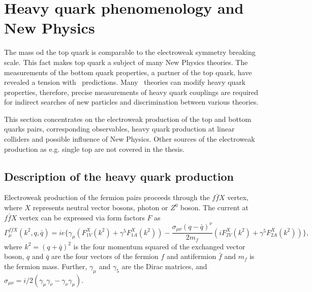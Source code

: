 	\section{Heavy quark phenomenology and New Physics}
The mass od the top quark is comparable to the electroweak symmetry breaking scale. 
This fact makes top quark a subject of many New Physics theories. 
The measurements of the bottom quark properties, a partner of the top quark, have revealed a tension with \sm\ predictions. 
Many \bsm\ theories can modify heavy quark properties, therefore, precise measurements of heavy quark couplings are required for indirect searches of new particles and discrimination between various theories. 

This section concentrates on the electroweak production of the top and bottom quarks pairs, corresponding observables, heavy quark production at linear colliders and possible influence of New Physics.
Other sources of the electroweak production as e.g. single top are not covered in the thesis. 


\subsection{Description of the heavy quark production}
Electroweak production of the fermion pairs proceeds through the $f\bar{f}X$ vertex, where $X$ represents neutral vector bosons, photon or $Z^0$ boson.  The current at $f\bar{f}X$ vertex can be expressed via form factors $F$ as 
\begin{equation}
\Gamma^{f\bar{f}X}_\mu (k^2,q,\bar{q}) = ie\{ \gamma_\mu (F^X_{1V}(k^2) + \gamma^5 F^X_{1A}(k^2)) - \frac{\sigma_{\mu\nu}(q-\bar{q})^\nu}{2m_f}(iF^X_{2V}(k^2) + \gamma^5 F^X_{2A}(k^2)) \},
\end{equation}
where $k^2= (q+\bar{q})^2$ is the four momentum squared of the exchanged vector boson, $q$ and $\bar{q}$ are the four vectors of the fermion $f$ and antifermion $\bar{f}$ and $m_f$ is the fermion mass. Further, $\gamma_\mu$ and $\gamma_5$ are the Dirac matrices, and $\sigma_{\mu\nu} = i/2(\gamma_\mu\gamma_\nu - \gamma_\nu\gamma_\mu)$.

